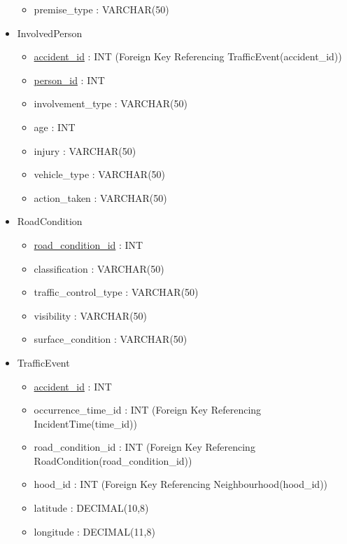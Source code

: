 \documentclass[12pt, a4paper]{article}
\begin{document}
\begin{itemize}
\begin{itemize}
        \item premise\_type : \color{blue} VARCHAR(50) \color{black}
    \end{itemize}
    \item InvolvedPerson
    \begin{itemize}
        \item \underline{accident\_id} : \color{blue} INT \color{black} (Foreign Key Referencing TrafficEvent(accident\_id))
        \item \underline{person\_id} :  \color{blue} INT \color{black}
        \item involvement\_type :  \color{blue} VARCHAR(50) \color{black}
        \item age : \color{blue} INT \color{black}
        \item injury : \color{blue} VARCHAR(50) \color{black}
        \item vehicle\_type :  \color{blue} VARCHAR(50) \color{black}
        \item action\_taken : \color{blue} VARCHAR(50) \color{black}
    \end{itemize}
    \item RoadCondition
    \begin{itemize}
        \item \underline{road\_condition\_id} : \color{blue} INT \color{black}
        \item classification : \color{blue} VARCHAR(50) \color{black}
        \item traffic\_control\_type : \color{blue} VARCHAR(50) \color{black}
        \item visibility : \color{blue} VARCHAR(50) \color{black}
        \item surface\_condition : \color{blue} VARCHAR(50) \color{black}
    \end{itemize}
    \item TrafficEvent
    \begin{itemize}
        \item \underline{accident\_id} : \color{blue} INT \color{black}
        \item occurrence\_time\_id : \color{blue} INT \color{black} (Foreign Key Referencing IncidentTime(time\_id))
        \item road\_condition\_id : \color{blue} INT \color{black} (Foreign Key Referencing RoadCondition(road\_condition\_id))
        \item hood\_id : \color{blue} INT \color{black} (Foreign Key Referencing Neighbourhood(hood\_id))
        \item latitude : \color{blue} DECIMAL(10,8) \color{black}
        \item longitude :  \color{blue} DECIMAL(11,8) \color{black}
    \end{itemize}
\end{itemize}
\color{blue}
\end{document}
